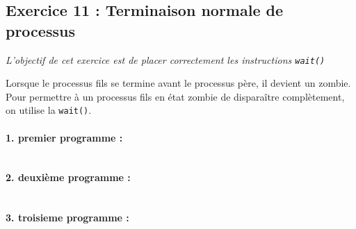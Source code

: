 \subsection{Exercice 11 : Terminaison normale de processus}
\textit{L’objectif de cet exercice est de placer correctement les instructions \texttt{wait()}}

Lorsque le processus fils se termine avant le processus père, il devient un zombie. Pour permettre à un processus fils en état zombie de disparaître complètement, on utilise la \texttt{wait()}.

\paragraph{1. premier programme :}
\inputminted[linenos,firstline=8, lastline=14]{cpp}{../sources/cpp/TP5-6/ex11-programme1.c}

\paragraph{2. deuxième programme :}
\inputminted[linenos,firstline=8, lastline=17]{cpp}{../sources/cpp/TP5-6/ex11-programme2.c}

\paragraph{3. troisieme programme :}
\inputminted[linenos,firstline=8, lastline=22]{cpp}{../sources/cpp/TP5-6/ex11-programme3.c}
